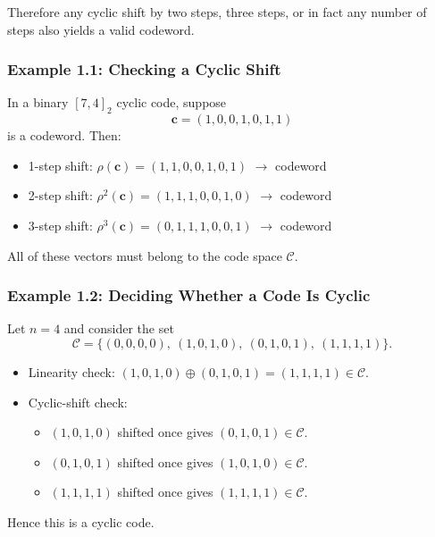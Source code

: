 \documentclass[11pt,oneside]{book}
\providecommand{\tightlist}{\setlength{\itemsep}{0pt}\setlength{\parskip}{0pt}}
\theoremstyle{plain}
\theoremstyle{definition}
\theoremstyle{remark}
\begin{document}
Therefore any cyclic shift by two steps, three steps, or in fact any
number of steps also yields a valid codeword.

\subsubsection{Example 1.1: Checking a Cyclic
Shift}\label{example-1.1-checking-a-cyclic-shift}

In a binary \([7,4]_2\) cyclic code, suppose
\[\mathbf{c} = (1,0,0,1,0,1,1)\] is a codeword. Then:

\begin{itemize}
\tightlist
\item
  1-step shift: \(\rho(\mathbf{c})=(1,1,0,0,1,0,1)\)
  $\to$ codeword
\item
  2-step shift: \(\rho^2(\mathbf{c})=(1,1,1,0,0,1,0)\)
  $\to$ codeword
\item
  3-step shift: \(\rho^3(\mathbf{c})=(0,1,1,1,0,0,1)\)
  $\to$ codeword
\end{itemize}

All of these vectors must belong to the code space \(\mathcal{C}\).

\subsubsection{Example 1.2: Deciding Whether a Code Is
Cyclic}\label{example-1.2-deciding-whether-a-code-is-cyclic}

Let \(n=4\) and consider the set
\[\mathcal{C} = \{(0,0,0,0),\ (1,0,1,0),\ (0,1,0,1),\ (1,1,1,1)\}.\]

\begin{itemize}
\tightlist
\item
  Linearity check:
  \((1,0,1,0) \oplus (0,1,0,1) = (1,1,1,1) \in \mathcal{C}\).
\item
  Cyclic-shift check:

  \begin{itemize}
  \tightlist
  \item
    \((1,0,1,0)\) shifted once gives \((0,1,0,1) \in \mathcal{C}\).
  \item
    \((0,1,0,1)\) shifted once gives \((1,0,1,0) \in \mathcal{C}\).
  \item
    \((1,1,1,1)\) shifted once gives \((1,1,1,1) \in \mathcal{C}\).
  \end{itemize}
\end{itemize}

Hence this is a cyclic code.
\end{document}
